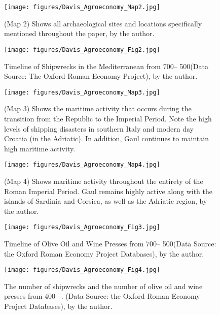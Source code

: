 	
	
	\begin{figure}[!p]
		\texttt{[image: figures/Davis\_Agroeconomy\_Map2.jpg]}
		\centering
		\caption{(Map 2) Shows all archaeological sites and locations specifically mentioned throughout the paper, by the author.}
		\label{fig:DavisMap2}
	\end{figure}
	
	
	\begin{figure}[!p]
		\texttt{[image: figures/Davis\_Agroeconomy\_Fig2.jpg]}
		\centering
		\caption{Timeline of Shipwrecks in the Mediterranean from 700\protect\BC -- 500\protect\AD (Data Source: The Oxford Roman Economy Project), by the author.}
		\label{fig:DavisFig2}
	\end{figure}
	
	
	\begin{figure}[!p]
		\texttt{[image: figures/Davis\_Agroeconomy\_Map3.jpg]}
		\centering
		\caption{(Map 3) Shows the maritime activity that occurs during the transition from the Republic to the Imperial Period. Note the high levels of shipping disasters in southern Italy and modern day Croatia (in the Adriatic). In addition, Gaul continues to maintain high maritime activity.}
		\label{fig:DavisMap3}
	\end{figure}
	
	
	\begin{figure}[!p]
		\texttt{[image: figures/Davis\_Agroeconomy\_Map4.jpg]}
		\centering
		\caption{(Map 4) Shows maritime activity throughout the entirety of the Roman Imperial Period. Gaul remains highly active along with the islands of Sardinia and Corsica, as well as the Adriatic region, by the author.}
		\label{fig:DavisMap4}
	\end{figure}
	
	
	
	\begin{figure}[!p]
		\texttt{[image: figures/Davis\_Agroeconomy\_Fig3.jpg]}
		\centering
		\caption{Timeline of Olive Oil and Wine Presses from 700\BC –  500\AD (Data Source: the Oxford Roman Economy Project Databases), by the author.}
		\label{fig:DavisFig3}
	\end{figure}
	
	
	\begin{figure}[!p]
		\texttt{[image: figures/Davis\_Agroeconomy\_Fig4.jpg]}
		\centering
		\caption{The number of shipwrecks and the number of olive oil and wine presses from 400\BC – . (Data Source: the Oxford Roman Economy Project Databases), by the author.}
		\label{fig:DavisFig4}
	\end{figure}
	

